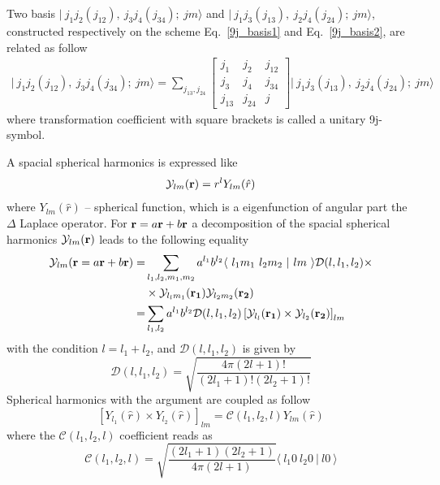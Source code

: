 \documentclass[12pt,a4paper,twoside]{article}
\begin{document}
Two basis  $\vert~ j_1 j_2 (j_{12}),~j_3 j_4 (j_{34});~jm \rangle$ and $\vert~ j_1 j_3 (j_{13}),~j_2 j_4 (j_{24});~jm \rangle $, constructed respectively on the scheme Eq.~\ref{9j_basis1} and Eq.~\ref{9j_basis2},  are related as follow
\begin{align}
\label{9j}
\vert~ j_1 j_2 (j_{12}),~j_3 j_4 (j_{34});~jm \rangle = \sum_{j_{13},j_{24}} 
\begin{bmatrix}
j_1 & j_2 & j_{12} \\ 
j_3 & j_4 & j_{34} \\ 
j_{13} & j_{24} & j
\end{bmatrix} 
\vert~ j_1 j_3 (j_{13}),~j_2 j_4 (j_{24});~jm \rangle 
\end{align}
where transformation coefficient with square brackets is called a unitary 9j-symbol.


  A spacial spherical harmonics is expressed like
  \begin{equation}
  \mathcal{Y}_{lm}({\bf r}) = r^{l} Y_{lm}(\hat{r})
  \end{equation}
  where $Y_{lm}(\hat{r})$  -- spherical function, which is a eigenfunction of angular part the $\Delta$ Laplace operator.
  For ${\bf r} = a{\bf r}+b {\bf r}$ a decomposition of the spacial spherical harmonics $\mathcal{Y}_{lm}({\bf r})$ leads to the following equality
  \begin{align}
  \mathcal{Y}_{lm}({\bf r} = a{\bf r}+b {\bf r})=& \sum_{l_1,l_2,m_1,m_2} a^{l_1} b^{l_2}
  \langle ~ l_1 m_1~l_2 m_2~ \vert ~l m~  \rangle \mathcal{D}(l,l_1,l_2) \times \nonumber \\
   & \times \mathcal{Y}_{l_l m_1}({\bf r_1})  \mathcal{Y}_{l_2 m_2}({\bf r_2}) \nonumber \\
   = & \sum_{l_1,l_2} a^{l_1} b^{l_2}
   \mathcal{D}(l,l_1,l_2) \left[ \mathcal{Y}_{l_l}({\bf r_1}) \times \mathcal{Y}_{l_2}({\bf r_2}) \right]_{lm} 
   \label{sphHarmDecomp}
  \end{align}
  with the condition $l=l_1+l_2$, and $\mathcal{D}(l,l_1,l_2) $ is given by
  \begin{equation}
  \mathcal{D}(l,l_1,l_2)  = \sqrt{\frac{4 \pi (2l+1)!}{(2l_1+1)! (2l_2+1)!}}
  \end{equation}
Spherical harmonics with the argument are coupled as follow
\begin{equation}
\left[ Y_{l_1}(\hat{r}) \times Y_{l_2}(\hat{r})\right]_{lm} =  \mathcal{C}(l_1,l_2,l) Y_{lm}(\hat{r})
\end{equation}
where the $\mathcal{C}(l_1,l_2,l)$ coefficient reads as
\begin{equation}
\mathcal{C}(l_1,l_2,l) = \sqrt{\frac{(2l_1+1)(2l_2+1)}{4 \pi (2l+1)}} \langle ~ l_1 0~l_2 0~ \vert ~l 0~  \rangle
\end{equation}
\end{document}
